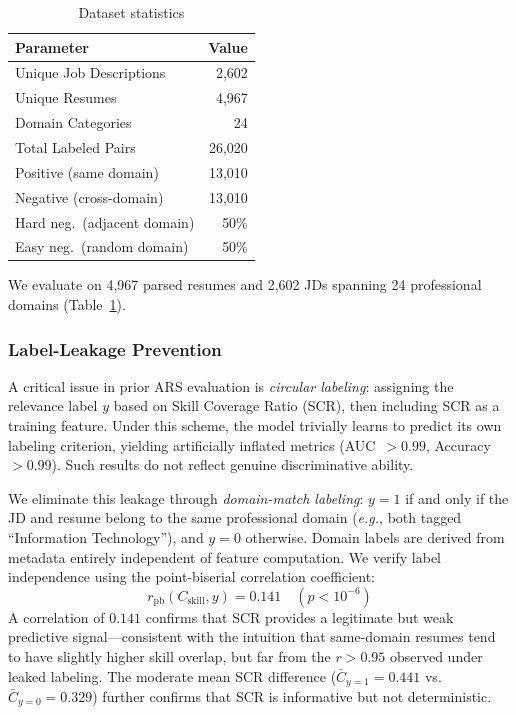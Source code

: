 \documentclass{llncs}
\begin{document}
\begin{table}[t]
\centering
\caption{Dataset statistics}
\label{tab:dataset}
\begin{tabular}{lr}
\toprule
Parameter & Value \\
\midrule
Unique Job Descriptions & 2,602 \\
Unique Resumes & 4,967 \\
Domain Categories & 24 \\
Total Labeled Pairs & 26,020 \\
Positive (same domain) & 13,010 \\
Negative (cross-domain) & 13,010 \\
\quad Hard neg.\ (adjacent domain) & 50\% \\
\quad Easy neg.\ (random domain) & 50\% \\
\bottomrule
\end{tabular}
\end{table}

We evaluate on 4,967 parsed resumes and 2,602 JDs spanning 24 professional domains (Table~\ref{tab:dataset}).

\subsubsection{Label-Leakage Prevention}
A critical issue in prior ARS evaluation is \textit{circular labeling}: assigning the relevance label $y$ based on Skill Coverage Ratio (SCR), then including SCR as a training feature. Under this scheme, the model trivially learns to predict its own labeling criterion, yielding artificially inflated metrics (AUC~$> 0.99$, Accuracy~$> 0.99$). Such results do not reflect genuine discriminative ability.

We eliminate this leakage through \textit{domain-match labeling}: $y{=}1$ if and only if the JD and resume belong to the same professional domain (\textit{e.g.}, both tagged ``Information Technology''), and $y{=}0$ otherwise. Domain labels are derived from metadata entirely independent of feature computation. We verify label independence using the point-biserial correlation coefficient:
\begin{equation}
    r_{\mathrm{pb}}(C_{\mathrm{skill}}, y) = 0.141 \quad (p < 10^{-6})
\end{equation}
A correlation of $0.141$ confirms that SCR provides a legitimate but weak predictive signal---consistent with the intuition that same-domain resumes tend to have slightly higher skill overlap, but far from the $r > 0.95$ observed under leaked labeling. The moderate mean SCR difference ($\bar{C}_{y=1} = 0.441$ vs.\ $\bar{C}_{y=0} = 0.329$) further confirms that SCR is informative but not deterministic.
\end{document}
